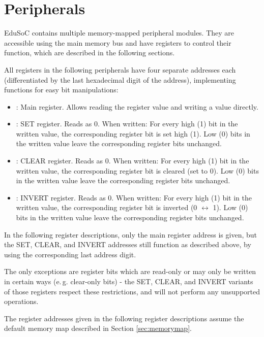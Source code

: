 \newpage
\section{Peripherals}\label{sec:peripherals}
EduSoC contains multiple memory-mapped peripheral modules. They are accessible using the main memory bus and have registers to control their function, which are described in the following sections.

All registers in the following peripherals have four separate addresses each (differentiated by the last hexadecimal digit of the address), implementing functions for easy bit manipulations:
\begin{itemize}
    \item {}: Main register. Allows reading the register value and writing a value directly.
    \item {}: SET register. Reads as 0. When written: For every high (1) bit in the written value, the corresponding register bit is set high (1). Low (0) bits in the written value leave the corresponding register bits unchanged.
    \item {}: CLEAR register. Reads as 0. When written: For every high (1) bit in the written value, the corresponding register bit is cleared (set to 0). Low (0) bits in the written value leave the corresponding register bits unchanged.
    \item {}: INVERT register. Reads as 0. When written: For every high (1) bit in the written value, the corresponding register bit is inverted (0 $\leftrightarrow$ 1). Low (0) bits in the written value leave the corresponding register bits unchanged.
\end{itemize}
In the following register descriptions, only the main register address is given, but the SET, CLEAR, and INVERT addresses still function as described above, by using the corresponding last address digit.

The only exceptions are register bits which are read-only or may only be written in certain ways (e.\,g. clear-only bits) - the SET, CLEAR, and INVERT variants of those registers respect these restrictions, and will not perform any unsupported operations.

The register addresses given in the following register descriptions assume the default memory map described in Section \ref{sec:memorymap}.








